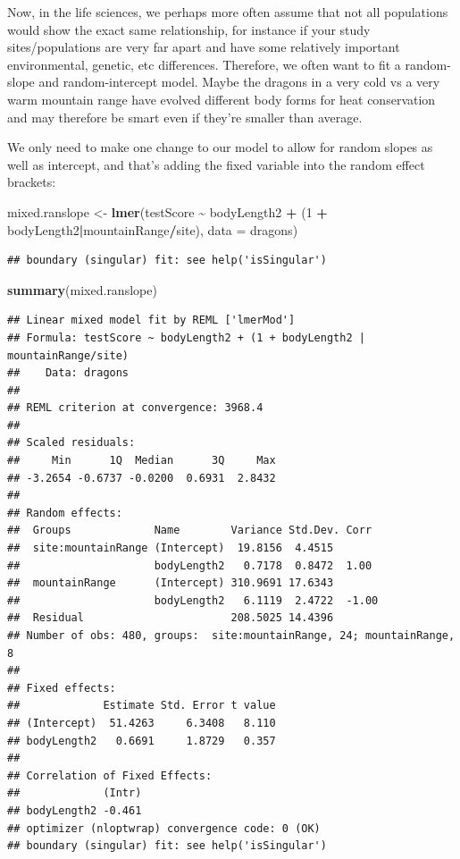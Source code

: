 \documentclass[
]{article}
\newenvironment{Shaded}{\begin{snugshade}}{\end{snugshade}}
\newcommand{\AttributeTok}[1]{\textcolor[rgb]{0.13,0.29,0.53}{#1}}
\newcommand{\DecValTok}[1]{\textcolor[rgb]{0.00,0.00,0.81}{#1}}
\newcommand{\FunctionTok}[1]{\textcolor[rgb]{0.13,0.29,0.53}{\textbf{#1}}}
\newcommand{\NormalTok}[1]{#1}
\newcommand{\OtherTok}[1]{\textcolor[rgb]{0.56,0.35,0.01}{#1}}
\newcommand{\SpecialCharTok}[1]{\textcolor[rgb]{0.81,0.36,0.00}{\textbf{#1}}}
\begin{document}
Now, in the life sciences, we perhaps more often assume that not all
populations would show the exact same relationship, for instance if your
study sites/populations are very far apart and have some relatively
important environmental, genetic, etc differences. Therefore, we often
want to fit a random-slope and random-intercept model. Maybe the dragons
in a very cold vs a very warm mountain range have evolved different body
forms for heat conservation and may therefore be smart even if they're
smaller than average.

We only need to make one change to our model to allow for random slopes
as well as intercept, and that's adding the fixed variable into the
random effect brackets:

\begin{Shaded}
\begin{Highlighting}[]
\NormalTok{mixed.ranslope }\OtherTok{\textless{}{-}} \FunctionTok{lmer}\NormalTok{(testScore }\SpecialCharTok{\textasciitilde{}}\NormalTok{ bodyLength2 }\SpecialCharTok{+}\NormalTok{ (}\DecValTok{1} \SpecialCharTok{+}\NormalTok{ bodyLength2}\SpecialCharTok{|}\NormalTok{mountainRange}\SpecialCharTok{/}\NormalTok{site), }\AttributeTok{data =}\NormalTok{ dragons)}
\end{Highlighting}
\end{Shaded}

\begin{verbatim}
## boundary (singular) fit: see help('isSingular')
\end{verbatim}

\begin{Shaded}
\begin{Highlighting}[]
\FunctionTok{summary}\NormalTok{(mixed.ranslope)}
\end{Highlighting}
\end{Shaded}

\begin{verbatim}
## Linear mixed model fit by REML ['lmerMod']
## Formula: testScore ~ bodyLength2 + (1 + bodyLength2 | mountainRange/site)
##    Data: dragons
## 
## REML criterion at convergence: 3968.4
## 
## Scaled residuals: 
##     Min      1Q  Median      3Q     Max 
## -3.2654 -0.6737 -0.0200  0.6931  2.8432 
## 
## Random effects:
##  Groups             Name        Variance Std.Dev. Corr 
##  site:mountainRange (Intercept)  19.8156  4.4515       
##                     bodyLength2   0.7178  0.8472  1.00 
##  mountainRange      (Intercept) 310.9691 17.6343       
##                     bodyLength2   6.1119  2.4722  -1.00
##  Residual                       208.5025 14.4396       
## Number of obs: 480, groups:  site:mountainRange, 24; mountainRange, 8
## 
## Fixed effects:
##             Estimate Std. Error t value
## (Intercept)  51.4263     6.3408   8.110
## bodyLength2   0.6691     1.8729   0.357
## 
## Correlation of Fixed Effects:
##             (Intr)
## bodyLength2 -0.461
## optimizer (nloptwrap) convergence code: 0 (OK)
## boundary (singular) fit: see help('isSingular')
\end{verbatim}
\end{document}

